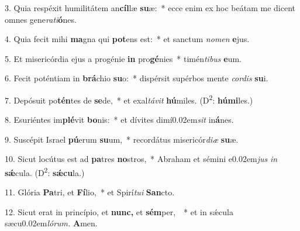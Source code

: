 \item 3. Quia respéxit humilitátem an\textbf{cíl}læ \textbf{su}æ:~* ecce enim ex hoc beátam me dicent omnes gene\textit{rati}\textbf{ó}nes.

\item 4. Quia fecit mihi \textbf{ma}gna qui \textbf{pot}ens est:~* et sanctum \textit{nomen} \textbf{e}jus.

\item 5. Et misericórdia ejus a progénie \textbf{in} pro\textbf{gé}nies~* timén\textit{tibus} \textbf{e}um.

\item 6. Fecit poténtiam in \textbf{brá}chio \textbf{su}o:~* dispérsit supérbos mente \textit{cordis} \textbf{su}i.

\item 7. Depósuit po\textbf{tén}tes de \textbf{se}de,~* et exal\textit{távit} \textbf{hú}miles. (D\textsuperscript{2}: \textbf{húmi}les.)

\item 8. Esuriéntes im\textbf{plé}vit \textbf{bo}nis:~* et dívites dimí\kern 0.02em\textit{sit} in\textbf{á}nes.

\item 9. Suscépit Israel \textbf{pú}erum \textbf{su}um,~* recordátus misericór\textit{diæ} \textbf{su}æ.

\item 10. Sicut locútus est ad \textbf{pa}tres \textbf{no}stros,~* Abraham et sémini e\kern 0.02em\textit{jus} \textit{in} \textbf{sǽ}cula. (D\textsuperscript{2}: \textbf{sǽcu}la.)

\item 11. Glória \textbf{Pa}tri, et \textbf{Fí}lio,~* et Spirí\textit{tui} \textbf{San}cto.

\item 12. Sicut erat in princípio, et \textbf{nunc,} et \textbf{sém}per, ~* et in sǽcula sæcu\kern 0.02em\textit{lórum.} \textbf{A}men.